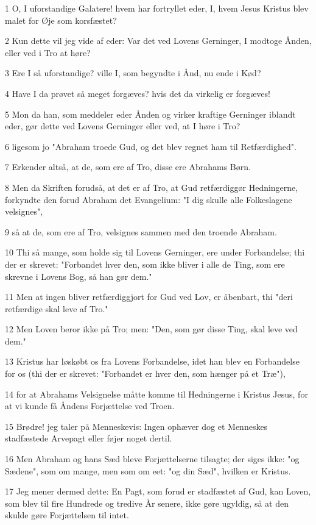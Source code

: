 \par 1 O, I uforstandige Galatere! hvem har fortryllet eder, I, hvem Jesus Kristus blev malet for Øje som korsfæstet?
\par 2 Kun dette vil jeg vide af eder: Var det ved Lovens Gerninger, I modtoge Ånden, eller ved i Tro at høre?
\par 3 Ere I så uforstandige? ville I, som begyndte i Ånd, nu ende i Kød?
\par 4 Have I da prøvet så meget forgæves? hvis det da virkelig er forgæves!
\par 5 Mon da han, som meddeler eder Ånden og virker kraftige Gerninger iblandt eder, gør dette ved Lovens Gerninger eller ved, at I høre i Tro?
\par 6 ligesom jo "Abraham troede Gud, og det blev regnet ham til Retfærdighed".
\par 7 Erkender altså, at de, som ere af Tro, disse ere Abrahams Børn.
\par 8 Men da Skriften forudså, at det er af Tro, at Gud retfærdiggør Hedningerne, forkyndte den forud Abraham det Evangelium: "I dig skulle alle Folkeslagene velsignes",
\par 9 så at de, som ere af Tro, velsignes sammen med den troende Abraham.
\par 10 Thi så mange, som holde sig til Lovens Gerninger, ere under Forbandelse; thi der er skrevet: "Forbandet hver den, som ikke bliver i alle de Ting, som ere skrevne i Lovens Bog, så han gør dem."
\par 11 Men at ingen bliver retfærdiggjort for Gud ved Lov, er åbenbart, thi "deri retfærdige skal leve af Tro."
\par 12 Men Loven beror ikke på Tro; men: "Den, som gør disse Ting, skal leve ved dem."
\par 13 Kristus har løskøbt os fra Lovens Forbandelse, idet han blev en Forbandelse for os (thi der er skrevet: "Forbandet er hver den, som hænger på et Træ"),
\par 14 for at Abrahams Velsignelse måtte komme til Hedningerne i Kristus Jesus, for at vi kunde få Åndens Forjættelse ved Troen.
\par 15 Brødre! jeg taler på Menneskevis: Ingen ophæver dog et Menneskes stadfæstede Arvepagt eller føjer noget dertil.
\par 16 Men Abraham og hans Sæd bleve Forjættelserne tilsagte; der siges ikke: "og Sædene", som om mange, men som om eet: "og din Sæd", hvilken er Kristus.
\par 17 Jeg mener dermed dette: En Pagt, som forud er stadfæstet af Gud, kan Loven, som blev til fire Hundrede og tredive År senere, ikke gøre ugyldig, så at den skulde gøre Forjættelsen til intet.

